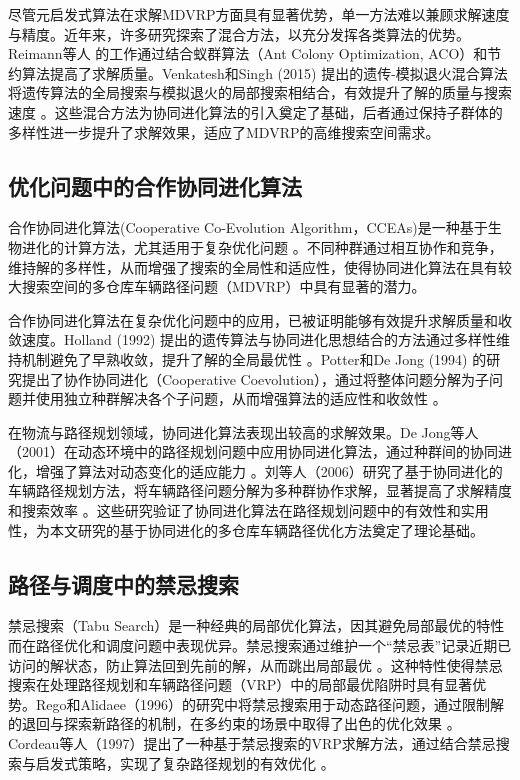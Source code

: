 \documentclass[12pt,a4paper,oneside]{ctexart}
\begin{document}
尽管元启发式算法在求解MDVRP方面具有显著优势，单一方法难以兼顾求解速度与精度。近年来，许多研究探索了混合方法，以充分发挥各类算法的优势。Reimann等人 \cite{reimann2004heuristic} 的工作通过结合蚁群算法（Ant Colony Optimization, ACO）和节约算法提高了求解质量。Venkatesh和Singh (2015) 提出的遗传-模拟退火混合算法将遗传算法的全局搜索与模拟退火的局部搜索相结合，有效提升了解的质量与搜索速度 \cite{venkatesh2015hybrid}。这些混合方法为协同进化算法的引入奠定了基础，后者通过保持子群体的多样性进一步提升了求解效果，适应了MDVRP的高维搜索空间需求。

\subsection{优化问题中的合作协同进化算法}

合作协同进化算法(Cooperative Co-Evolution Algorithm，CCEAs)是一种基于生物进化的计算方法，尤其适用于复杂优化问题 \cite{potter1994cooperative, holland1992adaptation}。不同种群通过相互协作和竞争，维持解的多样性，从而增强了搜索的全局性和适应性，使得协同进化算法在具有较大搜索空间的多仓库车辆路径问题（MDVRP）中具有显著的潜力。

合作协同进化算法在复杂优化问题中的应用，已被证明能够有效提升求解质量和收敛速度。Holland (1992) 提出的遗传算法与协同进化思想结合的方法通过多样性维持机制避免了早熟收敛，提升了解的全局最优性 \cite{holland1992adaptation}。Potter和De Jong (1994) 的研究提出了协作协同进化（Cooperative Coevolution），通过将整体问题分解为子问题并使用独立种群解决各个子问题，从而增强算法的适应性和收敛性 \cite{potter1994cooperative}。

在物流与路径规划领域，协同进化算法表现出较高的求解效果。De Jong等人（2001）在动态环境中的路径规划问题中应用协同进化算法，通过种群间的协同进化，增强了算法对动态变化的适应能力 \cite{dejong2001evolutionary}。刘等人（2006）研究了基于协同进化的车辆路径规划方法，将车辆路径问题分解为多种群协作求解，显著提高了求解精度和搜索效率 \cite{liu2006vehicle}。这些研究验证了协同进化算法在路径规划问题中的有效性和实用性，为本文研究的基于协同进化的多仓库车辆路径优化方法奠定了理论基础。


\subsection{路径与调度中的禁忌搜索}

禁忌搜索（Tabu Search）是一种经典的局部优化算法，因其避免局部最优的特性而在路径优化和调度问题中表现优异。禁忌搜索通过维护一个“禁忌表”记录近期已访问的解状态，防止算法回到先前的解，从而跳出局部最优 \cite{glover1986future}。这种特性使得禁忌搜索在处理路径规划和车辆路径问题（VRP）中的局部最优陷阱时具有显著优势。Rego和Alidaee（1996）的研究中将禁忌搜索用于动态路径问题，通过限制解的退回与探索新路径的机制，在多约束的场景中取得了出色的优化效果 \cite{rego1996tabu}。Cordeau等人（1997）提出了一种基于禁忌搜索的VRP求解方法，通过结合禁忌搜索与启发式策略，实现了复杂路径规划的有效优化 \cite{cordeau1997savings}。
\end{document}
